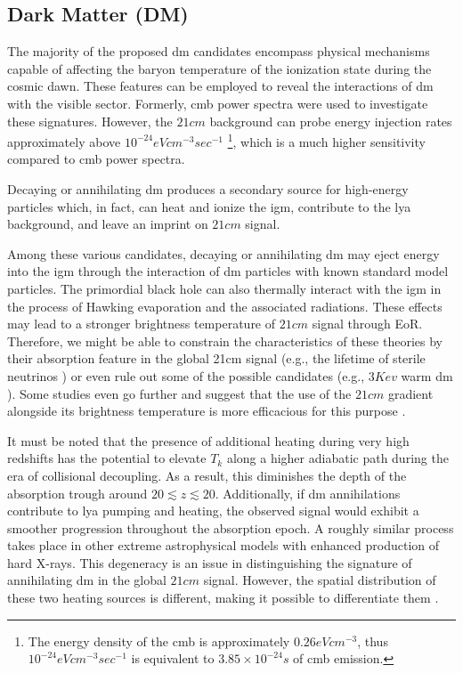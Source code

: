 \documentclass[12pt, TexShade, letterpaper]{report}
\begin{document}
\subsection{Dark Matter (DM)}
The majority of the proposed \gls{dm} candidates encompass physical mechanisms capable of affecting the baryon temperature of the ionization state during the cosmic dawn. These features can be employed to reveal the interactions of \gls{dm} with the visible sector. Formerly, \gls{cmb} power spectra were used to investigate these signatures. However, the $21cm$ background can probe energy injection rates approximately above $10^{-24}eV cm^{-3} sec^{-1}$ \footnote{The energy density of the \gls{cmb} is approximately $0.26 eV cm^{-3}$, thus $10^{-24}eV cm^{-3} sec^{-1}$ is equivalent to $3.85 \times 10^{-24} s$ of \gls{cmb} emission.}, which is a much higher sensitivity compared to \gls{cmb} power spectra.\par
Decaying or annihilating \gls{dm} produces a secondary source for high-energy particles which, in fact, can heat and ionize the \gls{igm}, contribute to the \gls{lya} background, and leave an imprint on $21cm$ signal. \par
Among these various candidates, decaying or annihilating \gls{dm} may eject energy into the \gls{igm} through the interaction of \gls{dm} particles with known standard model particles. The primordial black hole can also thermally interact with the \gls{igm} in the process of Hawking evaporation and the associated radiations. These effects may lead to a stronger brightness temperature of $21cm$ signal through EoR.  Therefore, we might be able to constrain the characteristics of these theories by their absorption feature in the global 21cm signal (e.g., the lifetime of sterile neutrinos \cite{sterile_neutrino}) \cite{primordial_bh, new_physics_thesis, primordial_bh_binary, 21limit_dm_bh, bound_dm} or even rule out some of the possible candidates (e.g., $3 Kev$ warm \gls{dm} \cite{rule_out}). Some studies even go further and suggest that the use of the $21cm$ gradient alongside its brightness temperature is more efficacious for this purpose \cite{DM_anihilation_furlantto, constrain_dm_21, DM_anihilation_1, DM_ionize, dark_cosmology_21, snowmass_dm}.\par

It must be noted that the presence of additional heating during very high redshifts has the potential to elevate $T_k$ along a higher adiabatic path during the era of collisional decoupling. As a result, this diminishes the depth of the absorption trough around $20 \lesssim z \lesssim 20$. Additionally, if \gls{dm} annihilations contribute to \gls{lya} pumping and heating, the observed signal would exhibit a smoother progression throughout the absorption epoch. A roughly similar process takes place in other extreme astrophysical models with enhanced production of hard X-rays. This degeneracy is an issue in distinguishing the signature of annihilating \gls{dm} in the global $21cm$ signal. However, the spatial distribution of these two heating sources is different, making it possible to differentiate them \cite{dark_nature_21}. \par
\end{document}
